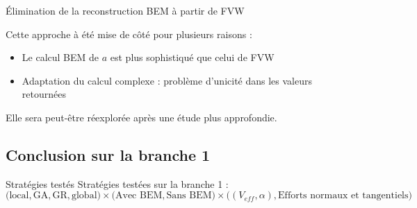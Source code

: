 \documentclass[
11pt,notheorems,hyperref={pdfauthor=whatever}
]{beamer}
\begin{document}
\begin{frame}{Élimination de la reconstruction BEM à partir de FVW}
    \vspace{0.5cm}
    
    Cette approche à été mise de côté pour plusieurs raisons : 
    \begin{itemize}
        \item Le calcul BEM de $a$ est plus sophistiqué que celui de FVW
        \item Adaptation du calcul complexe : problème d'unicité dans les valeurs retournées
    \end{itemize}

    \vspace{0.3cm}
    
    Elle sera peut-être réexplorée après une étude plus approfondie.
\end{frame}

\subsection{Conclusion sur la branche 1}

\begin{frame}{Stratégies testés}
    Stratégies testées sur la branche 1 : 
    \[
        \bigl(\text{local}, \text{GA}, \text{GR}, \text{global}\bigr) \times \bigl(\text{Avec BEM}, \text{Sans BEM}\bigr) \times \bigl((V_{eff},\alpha) , \text{Efforts normaux et tangentiels}\bigr)
    \]
    
\end{frame}
\end{document}
